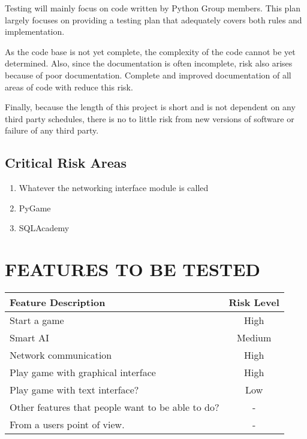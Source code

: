 \documentclass[report]{article}
\begin{document}
Testing will mainly focus on code written by Python Group members. This plan largely focuses on providing a testing plan that adequately covers both rules and implementation.

As the code base is not yet complete, the complexity of the code cannot be yet determined. Also, since the documentation is often incomplete, risk also arises because of poor documentation. Complete and improved documentation of all areas of code with reduce this risk.

Finally, because the length of this project is short and is not dependent on any third party schedules, there is no to little risk from new versions of software or failure of any third party.

\subsection{Critical Risk Areas}
\begin{enumerate}
\item Whatever the networking interface module is called
\item PyGame
\item SQLAcademy
\end{enumerate} 

\section[FEATURES TO BE TESTED]{FEATURES TO BE TESTED}
\begin{center}
\begin{tabularx}{\textwidth}{| X | c |}
  \hline
  \textbf{Feature Description} &
    \textbf{Risk Level} 
\\ \hline
Start a game & High
\\ \hline
Smart AI & Medium
\\ \hline
Network communication & High
\\ \hline
Play game with graphical interface & High
\\ \hline
Play game with text interface? & Low
\\ \hline
Other features that people want to be able to do? & -
\\ \hline
From a users point of view. & -
\\ \hline
\end{tabularx}
\end{center}
\end{document}

